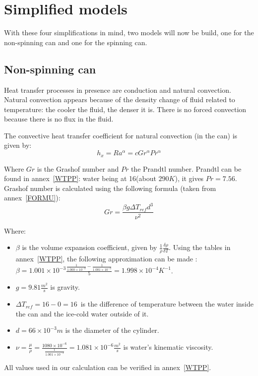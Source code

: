 \documentclass{report}
\begin{document}
	
	\section{Simplified models}\label{sm}
	
	With these four simplifications in mind, two models will now be build, one for the non-spinning can and one for the spinning can.
	
	\subsection{Non-spinning can}\label{nsc}
	
	Heat transfer processes in presence are conduction and natural convection. Natural convection appears because of the density change of fluid related to temperature: the cooler the fluid, the denser it is. There is no forced convection because there is no flux in the fluid.
	
	The convective heat transfer coefficient for natural convection (in the can) is given by:
	\begin{equation}
		h_x=Ra^\alpha = cGr^\alpha Pr^\alpha
	\end{equation}
	
	Where $Gr$ is the Grashof number and $Pr$ the Prandtl number. Prandtl can be found in annex~\ref{WTPP}: water being at 16\textcelsius (about $290K$), it gives $Pr=7.56$.\\
	Grashof number is calculated using the following formula (taken from annex~\ref{FORMU}):
	\begin{equation}
		Gr=\frac{\beta g \Delta T_{ref} d^3}{\nu^2}
	\end{equation}
	
	Where:
	\begin{itemize}
		\item $\beta$ is the volume expansion coefficient, given by $\frac{1}{\rho}\frac{\delta\rho}{\delta T}$. Using the tables in annex~\ref{WTPP}, the following approximation can be made : $\beta=1.001\times 10^{-3}\frac{\frac{1}{1.000\times 10^{-3}}-\frac{1}{1.001\times 10^{-3}}}{5}=1.998\times 10^{-4} K^{-1}$.
		\item $g=9.81\frac{m^2}{s}$ is gravity.
		\item $\Delta T_{ref}=16-0=16$\textcelsius\ is the difference of temperature between the water inside the can and the ice-cold water outside of it.
		\item $d=66\times 10^{-3}m$ is the diameter of the cylinder.
		\item $\nu=\frac{\mu}{\rho}=\frac{1080\times 10^{-6}}{\frac{1}{1.001\times 10^{-3}}}=1.081\times 10^{-6}\frac{m^2}{s}$ is water's kinematic viscosity.
	\end{itemize}
	All values used in our calculation can be verified in annex~\ref{WTPP}.
	
\end{document}

